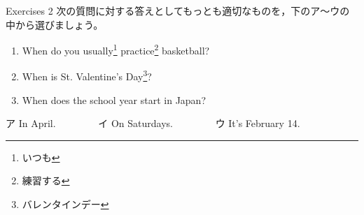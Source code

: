 \documentclass[aspectratio=169]{beamer}
\begin{document}
\begin{frame}[plain]{Exercises 2}
 次の質問に対する答えとしてもっとも適切なものを，下のア～ウの中から選びましょう。

\begin{enumerate}
 \item When do you usually\footnote{いつも} practice\footnote{練習する} basketball?\hspace{10pt}\hspace{21pt}
 \item When is St. Valentine's Day\footnote{バレンタインデー}?\hspace{80pt}\hspace{12pt}
 \item When does the school year start in Japan?\hspace{15pt}\hspace{50pt}
\end{enumerate}

\begin{tcolorbox}
\centering
ア In April.~~~~~~~~%
イ On Saturdays.~~~~~~~~%
ウ It's February 14. 
\end{tcolorbox}


\end{frame}
\end{document}

